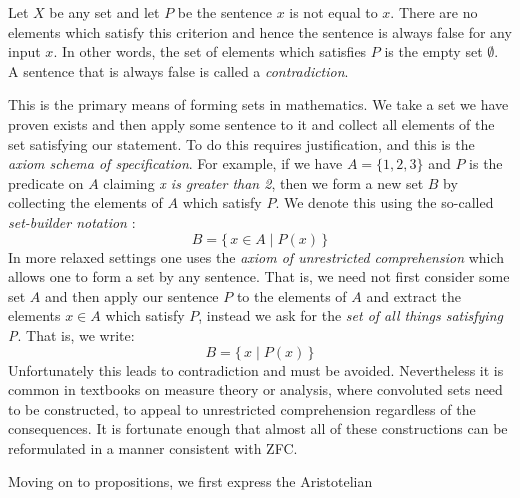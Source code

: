         \begin{example}
            Let $X$ be any set and let $P$ be the sentence $x$ is not equal to
            $x$. There are no elements which satisfy this criterion and hence
            the sentence is always false for any input $x$. In other words, the
            set of elements which satisfies $P$ is the empty set $\emptyset$.
            A sentence that is always false is called a
            \textit{contradiction}.
        \end{example}
        This is the primary means of forming sets in mathematics. We take a set
        we have proven exists and then apply some sentence to it and collect all
        elements of the set satisfying our statement. To do this requires
        justification, and this is the \textit{axiom schema of specification}.
        For example, if we have $A=\{1,2,3\}$ and $P$ is the predicate on $A$
        claiming \textit{x is greater than 2}, then we form a new set $B$ by
        collecting the elements of $A$ which satisfy $P$. We denote this using
        the so-called \textit{set-builder notation}%
        :
        \begin{equation}
            B=\{\,x\in{A}\;|\;P(x)\,\}
        \end{equation}
        In more relaxed settings one uses the \textit{axiom of unrestricted}
        \textit{comprehension} which
        allows one to form a set by any sentence. That is, we need not first
        consider some set $A$ and then apply our sentence $P$ to the elements of
        $A$ and extract the elements $x\in{A}$ which satisfy $P$, instead we
        ask for the \textit{set of all things satisfying P}. That is, we write:
        \begin{equation}
            B=\{\,x\;|\;P(x)\,\}
        \end{equation}
        Unfortunately this leads to contradiction and must be avoided.
        Nevertheless it is common in textbooks on measure theory or analysis,
        where convoluted sets need to be constructed, to appeal to unrestricted
        comprehension regardless of the consequences. It is fortunate enough
        that almost all of these constructions can be reformulated in a manner
        consistent with \gls{ZFC}.
        \par\hfill\par
        Moving on to propositions, we first express the Aristotelian
